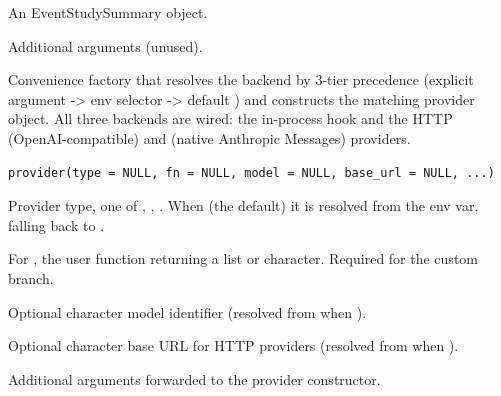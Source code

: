 \documentclass[a4paper]{book}
\begin{document}
%
\begin{Arguments}
\begin{ldescription}
\item[\code{x}] An EventStudySummary object.

\item[\code{...}] Additional arguments (unused).
\end{ldescription}
\end{Arguments}
%
\begin{Description}
Convenience factory that resolves the backend by 3-tier precedence
(explicit  argument ->  env
selector -> default ) and constructs the matching provider
object. All three backends are wired: the in-process  hook and
the HTTP  (OpenAI-compatible) and  (native
Anthropic Messages) providers.
\end{Description}
%
\begin{Usage}
\begin{verbatim}
provider(type = NULL, fn = NULL, model = NULL, base_url = NULL, ...)
\end{verbatim}
\end{Usage}
%
\begin{Arguments}
\begin{ldescription}
\item[\code{type}] Provider type, one of , ,
. When  (the default) it is resolved from the
 env var, falling back to .

\item[\code{fn}] For , the user function
 returning a list or character. Required
for the custom branch.

\item[\code{model}] Optional character model identifier (resolved from
 when ).

\item[\code{base\_url}] Optional character base URL for HTTP providers (resolved from
 when ).

\item[\code{...}] Additional arguments forwarded to the provider constructor.
\end{ldescription}
\end{Arguments}
\end{document}
